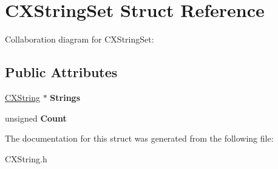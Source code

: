 \hypertarget{structCXStringSet}{}\section{C\+X\+String\+Set Struct Reference}
\label{structCXStringSet}


Collaboration diagram for C\+X\+String\+Set\+:
\subsection*{Public Attributes}
\begin{DoxyCompactItemize}
\item 
\mbox{\label{structCXStringSet_a5f79318710bec53e295f32040e302127}} 
\hyperlink{structCXString}{C\+X\+String} $\ast$ {\bfseries Strings}
\item 
\mbox{\label{structCXStringSet_acd708a7c03946993840847776ec31e50}} 
unsigned {\bfseries Count}
\end{DoxyCompactItemize}


The documentation for this struct was generated from the following file\+:\begin{DoxyCompactItemize}
\item 
C\+X\+String.\+h\end{DoxyCompactItemize}
